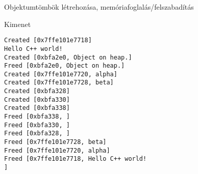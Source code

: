 \documentclass[usenames,dvipsnames,aspectratio=169]{beamer}
\begin{document}
\begin{frame}
    Objektumtömbök létrehozása, memóriafoglalás/felszabadítás
    \begin{exampleblock}{}
        \scriptsize
        
    \end{exampleblock}
\end{frame}

\begin{frame}
    \begin{exampleblock}{}
        \scriptsize
        
    \end{exampleblock}
\end{frame}

\begin{frame}
    \begin{exampleblock}{}
        \footnotesize
        
    \end{exampleblock}
\end{frame}

\begin{frame}[fragile]
    \begin{block}{Kimenet}
        \scriptsize
        \vspace{-0.3cm}
        \begin{verbatim}
Created [0x7ffe101e7718]
Hello C++ world!
Created [0xbfa2e0, Object on heap.]
Freed [0xbfa2e0, Object on heap.]
Created [0x7ffe101e7720, alpha]
Created [0x7ffe101e7728, beta]
Created [0xbfa328]
Created [0xbfa330]
Created [0xbfa338]
Freed [0xbfa338, ]
Freed [0xbfa330, ]
Freed [0xbfa328, ]
Freed [0x7ffe101e7728, beta]
Freed [0x7ffe101e7720, alpha]
Freed [0x7ffe101e7718, Hello C++ world!
]
\end{verbatim}
        \vspace{-0.3cm}
    \end{block}
\end{frame}
\end{document}
